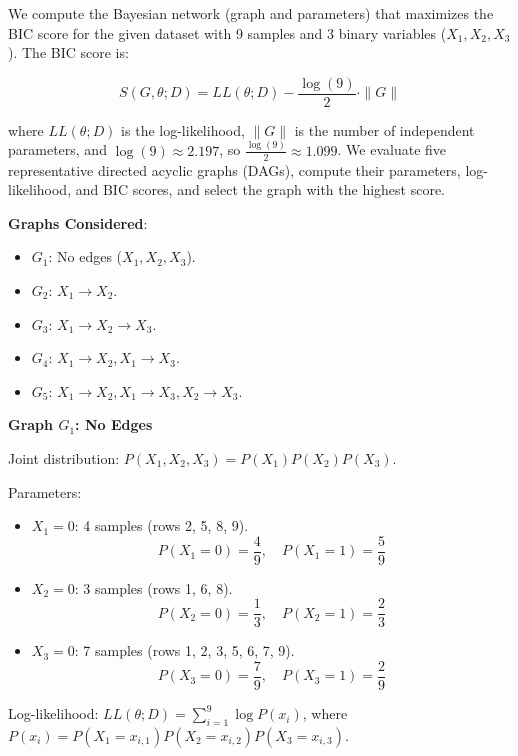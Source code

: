\documentclass[a3paper,12pt]{extarticle} %
\begin{document}
We compute the Bayesian network (graph and parameters) that maximizes the BIC score for the given dataset with 9 samples and 3 binary variables (\(X_1, X_2, X_3\)). The BIC score is:

\[
S(G, \theta; D) = LL(\theta; D) - \frac{\log(9)}{2} \cdot \|G\|
\]

where \(LL(\theta; D)\) is the log-likelihood, \(\|G\|\) is the number of independent parameters, and \(\log(9) \approx 2.197\), so \(\frac{\log(9)}{2} \approx 1.099\). We evaluate five representative directed acyclic graphs (DAGs), compute their parameters, log-likelihood, and BIC scores, and select the graph with the highest score.

\textbf{Graphs Considered}:
\begin{itemize}
    \item \(G_1\): No edges (\(X_1, X_2, X_3\)).
    \item \(G_2\): \(X_1 \to X_2\).
    \item \(G_3\): \(X_1 \to X_2 \to X_3\).
    \item \(G_4\): \(X_1 \to X_2, X_1 \to X_3\).
    \item \(G_5\): \(X_1 \to X_2, X_1 \to X_3, X_2 \to X_3\).
\end{itemize}

\textbf{Graph \(G_1\): No Edges}

Joint distribution: \(P(X_1, X_2, X_3) = P(X_1)P(X_2)P(X_3)\).

Parameters:
\begin{itemize}
    \item \(X_1 = 0\): 4 samples (rows 2, 5, 8, 9).
    \[
    P(X_1 = 0) = \frac{4}{9}, \quad P(X_1 = 1) = \frac{5}{9}
    \]
    \item \(X_2 = 0\): 3 samples (rows 1, 6, 8).
    \[
    P(X_2 = 0) = \frac{1}{3}, \quad P(X_2 = 1) = \frac{2}{3}
    \]
    \item \(X_3 = 0\): 7 samples (rows 1, 2, 3, 5, 6, 7, 9).
    \[
    P(X_3 = 0) = \frac{7}{9}, \quad P(X_3 = 1) = \frac{2}{9}
    \]
\end{itemize}

Log-likelihood: \(LL(\theta; D) = \sum_{i=1}^9 \log P(x_i)\), where \(P(x_i) = P(X_1 = x_{i,1}) P(X_2 = x_{i,2}) P(X_3 = x_{i,3})\).
\end{document}
